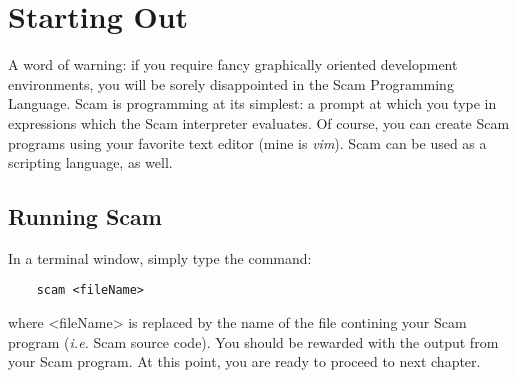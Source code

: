 \chapter{Starting Out}
\label{StartingOut}

A word of warning: if you require fancy graphically oriented development
environments, you will be sorely disappointed in the Scam Programming
Language. Scam is programming at its simplest: a prompt at which you type
in expressions which the Scam interpreter evaluates. Of course, you can
create Scam programs using your favorite text editor (mine is {\it vim}).
Scam can be used as a scripting language, as well.

\section{Running Scam}

In a terminal window, simply type the command:

\begin{verbatim}
    scam <fileName>
\end{verbatim}

where <fileName> is replaced by the name of the file contining your
Scam program ({\it i.e.} Scam source code).
You should be rewarded with the output from your Scam program.
At this point, you are ready to proceed to next chapter.
